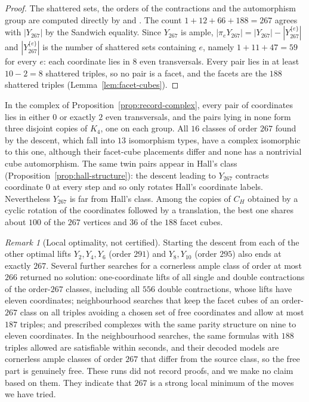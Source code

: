\documentclass[11pt]{article}
\numberwithin{equation}{section}
\theoremstyle{definition}
\theoremstyle{remark}
\newtheorem{remark}[theorem]{Remark}
\begin{document}
\begin{proof}
The shattered sets, the orders of the contractions and the automorphism
group are computed directly by 
and .  The count
\(1+12+66+188=267\) agrees with \(|Y_{267}|\) by the Sandwich equality.
Since \(Y_{267}\) is ample, \(|\pi_eY_{267}|=|Y_{267}|-|Y_{267}^{\{e\}}|\) and
\(|Y_{267}^{\{e\}}|\) is the number of shattered sets containing \(e\), namely
\(1+11+47=59\) for every \(e\): each coordinate lies in \(8\) even
transversals.  Every pair lies in at least \(10-2=8\) shattered triples, so no
pair is a facet, and the facets are the \(188\) shattered triples
(Lemma~\ref{lem:facet-cubes}).
\end{proof}

In the complex of Proposition~\ref{prop:record-complex}, every pair of
coordinates lies in either \(0\) or exactly \(2\) even transversals, and the
pairs lying in none form three disjoint copies of \(K_4\), one on each group.
All \(16\) classes of order \(267\) found by the descent, which fall into
\(13\) isomorphism types, have a complex isomorphic to this one, although
their facet-cube placements differ and none has a nontrivial cube
automorphism.  The same twin pairs appear in Hall's class
(Proposition~\ref{prop:hall-structure}): the descent leading to \(Y_{267}\)
contracts coordinate \(0\) at every step and so only rotates Hall's
coordinate labels.  Nevertheless \(Y_{267}\) is far from Hall's class.
Among the copies of \(C_H\) obtained by a cyclic rotation of the coordinates
followed by a translation, the best one shares about \(100\) of the \(267\)
vertices and \(36\) of the \(188\) facet cubes.

\begin{remark}[Local optimality, not certified]
\label{rem:descent-local}
Starting the descent from each of the other optimal lifts \(Y_2,Y_4,Y_6\)
(order \(291\)) and \(Y_8,Y_{10}\) (order \(295\)) also ends at exactly
\(267\).  Several further searches for a cornerless ample class of order at
most \(266\) returned no solution: one-coordinate lifts of all single and
double contractions of the order-\(267\) classes, including all \(556\)
double contractions, whose lifts have eleven coordinates; neighbourhood
searches that keep the facet cubes of an order-\(267\) class on all triples
avoiding a chosen set of free coordinates and allow at most \(187\)
triples; and prescribed complexes with the same parity structure on nine to
eleven coordinates.  In the neighbourhood searches, the same formulas with
\(188\) triples allowed are satisfiable within seconds, and their decoded
models are cornerless ample classes of order \(267\) that differ from the
source class, so the free part is genuinely free.  These runs did not
record proofs, and we make no claim based on them.  They indicate that
\(267\) is a strong local minimum of the moves we have tried.
\end{remark}
\end{document}

